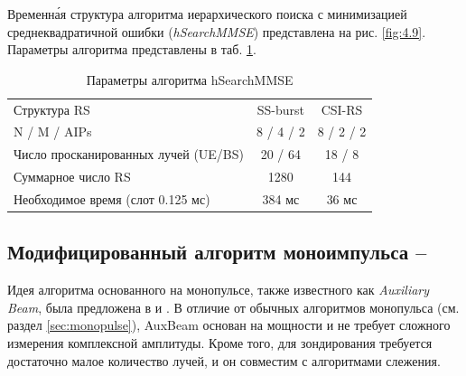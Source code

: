 Временн\'{а}я структура алгоритма иерархического поиска с минимизацией
среднеквадратичной ошибки (\textit{hSearchMMSE}) представлена на рис. \ref{fig:4.9}.
Параметры алгоритма представлены в таб. \ref{tab:4.3}.
\begin{table}
    \centering
    \caption{Параметры алгоритма hSearchMMSE}
    \label{tab:4.3}
    \begin{tabular}{lcc}
        \toprule
        \midrule
        Структура RS                                  & SS-burst  & CSI-RS    \\
        N / M / AIPs                                  & 8 / 4 / 2 & 8 / 2 / 2 \\
        Число просканированных \newline лучей (UE/BS) & 20 / 64   & 18 / 8    \\
        Суммарное число RS                            & 1280      & 144       \\
        Необходимое время (слот 0.125 мс)             & 384 мс    & 36 мс     \\
        \bottomrule
    \end{tabular}
\end{table}

\subsection[Модифицированный алгоритм моноимпульса]{Модифицированный алгоритм моноимпульса -- \AuxBeam}
\label{sec:AuxBeam:singlepath}
Идея алгоритма основанного на монопульсе, также известного как \textit{Auxiliary Beam}, была
предложена в \cite{Zhu2016} и \cite{Kim2019}. В отличие от обычных алгоритмов
монопульса (см. раздел \ref{sec:monopulse}), AuxBeam основан на мощности и не
требует сложного измерения комплексной амплитуды. Кроме того, для зондирования требуется
достаточно малое количество лучей, и он совместим с алгоритмами слежения.

